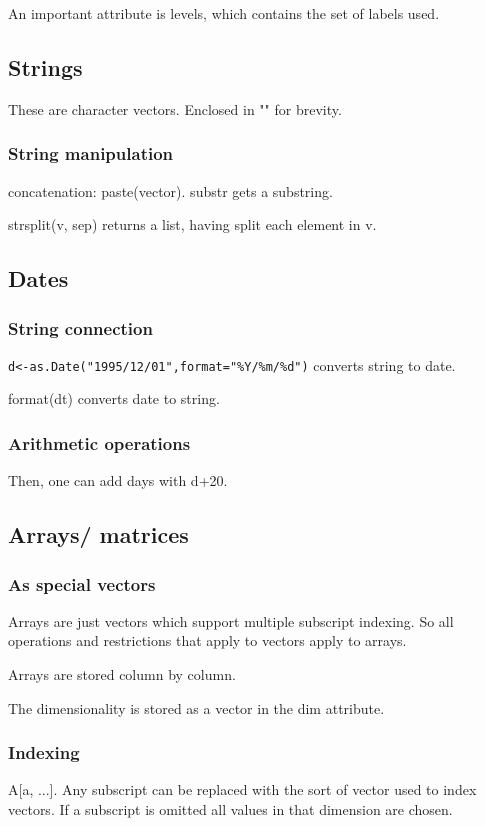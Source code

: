 An important attribute is levels, which contains the set of labels used.

\subsection{Strings}
These are character vectors. Enclosed in "" for brevity.

\subsubsection{String manipulation}
concatenation: paste(vector). substr gets a substring.

strsplit(v, sep) returns a list, having split each element in v.

\subsection{Dates}
\subsubsection{String connection}
\verb'd<-as.Date("1995/12/01",format="%Y/%m/%d")' converts string to date.

format(dt) converts date to string.

\subsubsection{Arithmetic operations}
Then, one can add days with d+20.

\subsection{Arrays/ matrices}
\subsubsection{As special vectors}
Arrays are just vectors which support multiple subscript indexing. So all operations and restrictions that apply to vectors apply to arrays.

Arrays are stored column by column.

The dimensionality is stored as a vector in the dim attribute.

\subsubsection{Indexing}
A[a, ...]. Any subscript can be replaced with the sort of vector used to index vectors. If a subscript is omitted all values in that dimension are chosen.

